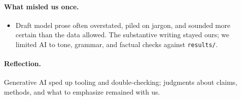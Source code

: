 \documentclass[11pt]{article}
\begin{document}
\paragraph{What misled us once.}
\begin{itemize}
\setlength{\itemsep}{1pt}
    \item Draft model prose often overstated, piled on jargon, and sounded more certain than the data allowed. The substantive writing stayed ours; we limited AI to tone, grammar, and factual checks against \texttt{results/}.
\end{itemize}

\paragraph{Reflection.}
Generative AI sped up tooling and double-checking; judgments about claims, methods, and what to emphasize remained with us.

\clearpage
\end{document}

